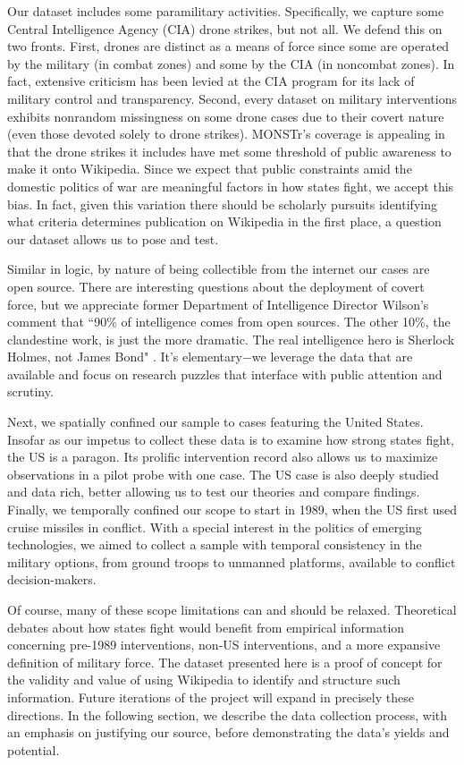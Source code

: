 \documentclass[fleqn,12pt]{article}
\begin{document}
Our dataset includes some paramilitary activities. Specifically, we capture some Central Intelligence Agency (CIA) drone strikes, but not all. We defend this on two fronts. First, drones are distinct as a means of force since some are operated by the military (in combat zones) and some by the CIA (in noncombat zones). In fact, extensive criticism has been levied at the CIA program for its lack of military control and transparency. Second, every dataset on military interventions exhibits nonrandom missingness on some drone cases due to their covert nature (even those devoted solely to drone strikes). MONSTr’s coverage is appealing in that the drone strikes it includes have met some threshold of public awareness to make it onto Wikipedia. Since we expect that public constraints amid the domestic politics of war are meaningful factors in how states fight, we accept this bias. In fact, given this variation there should be scholarly pursuits identifying what criteria determines publication on Wikipedia in the first place, a question our dataset allows us to pose and test.

Similar in logic, by nature of being collectible from the internet our cases are open source. There are interesting questions about the deployment of covert force, but we appreciate former Department of Intelligence Director Wilson's comment that ``90\% of intelligence comes from open sources. The other 10\%, the clandestine work, is just the more dramatic. The real intelligence hero is Sherlock Holmes, not James Bond" \citep{Lands19}. It's elementary$-$we leverage the data that are available and focus on research puzzles that interface with public attention and scrutiny.

Next, we spatially confined our sample to cases featuring the United States. Insofar as our impetus to collect these data is to examine how strong states fight, the US is a paragon. Its prolific intervention record also allows us to maximize observations in a pilot probe with one case. The US case is also deeply studied and data rich, better allowing us to test our theories and compare findings. Finally, we temporally confined our scope to start in 1989, when the US first used cruise missiles in conflict. With a special interest in the politics of emerging technologies, we aimed to collect a sample with temporal consistency in the military options, from ground troops to unmanned platforms, available to conflict decision-makers.

Of course, many of these scope limitations can and should be relaxed. Theoretical debates about how states fight would benefit from empirical information concerning pre-1989 interventions, non-US interventions, and a more expansive definition of military force. The dataset presented here is a proof of concept for the validity and value of using Wikipedia to identify and structure such information. Future iterations of the project will expand in precisely these directions. In the following section, we describe the data collection process, with an emphasis on justifying our source, before demonstrating the data's yields and potential.
\end{document}
